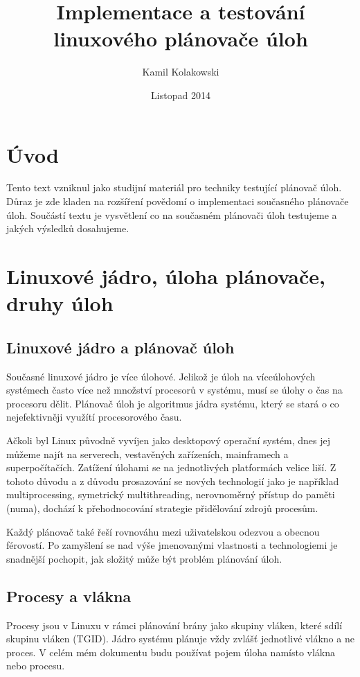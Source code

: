 \documentclass[a4paper,12pt]{article}
\begin{document}
\title{Implementace a testování linuxového plánovače úloh}
\author{Kamil Kolakowski}
\date{Listopad 2014}
\maketitle

\section*{Úvod}
Tento text vzniknul jako studijní materiál pro techniky testující plánovač úloh. Důraz je zde kladen na rozšíření povědomí o implementaci současného plánovače úloh. Součástí textu je vysvětlení co na současném plánovači úloh testujeme a jakých výsledků dosahujeme.  

\tableofcontents
\listoffigures

\section{Linuxové jádro, úloha plánovače, druhy úloh}

\subsection{Linuxové jádro a plánovač úloh}

Současné linuxové jádro je více úlohové. Jelikož je úloh na víceúlohových systémech často více než množství procesorů v systému, musí se úlohy o čas na procesoru dělit.
Plánovač úloh je algoritmus jádra systému, který se stará o co nejefektivněji využítí procesorového času.

Ačkoli byl Linux původně vyvíjen jako desktopový operační systém, dnes jej můžeme najít na serverech, vestavěných zařízeních, mainframech a superpočítačích. Zatížení úlohami se na jednotlivých platformách velice liší. Z tohoto důvodu a z důvodu prosazování se nových technologií jako je například multiprocessing, symetrický multithreading, nerovnoměrný přístup do paměti (numa), dochází k přehodnocování strategie přidělování zdrojů procesům. 

Každý plánovač také řeší rovnováhu mezi uživatelskou odezvou a obecnou férovostí. Po zamyšlení se nad výše jmenovanými vlastnosti a technologiemi je snadnější pochopit, jak složitý může být problém plánování úloh.

\subsection{Procesy a vlákna}
Procesy jsou v Linuxu v rámci plánování brány jako skupiny vláken, které sdílí skupinu vláken (TGID). Jádro systému plánuje vždy zvlášť jednotlivé vlákno a ne proces. V celém mém dokumentu budu používat pojem úloha namísto vlákna nebo procesu.
\end{document}
